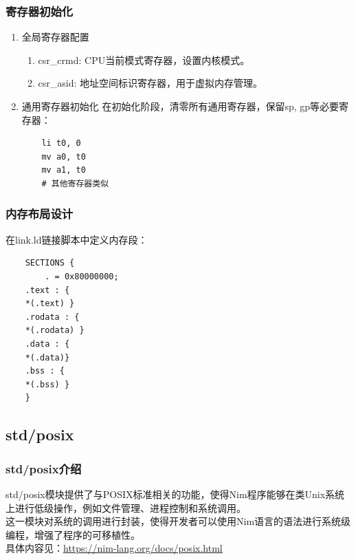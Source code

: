 \documentclass[UTF8]{ctexart}
\begin{document}
		\subsubsection{寄存器初始化} %
		\begin{enumerate}[leftmargin=3.5em]
			\item 全局寄存器配置
			\begin{enumerate}[leftmargin=1em]
				\item csr\_crmd: CPU当前模式寄存器，设置内核模式。
				\item csr\_asid: 地址空间标识寄存器，用于虚拟内存管理。
			\end{enumerate}
			\item 通用寄存器初始化
			在初始化阶段，清零所有通用寄存器，保留sp, gp等必要寄存器：
			\begin{tcolorbox}[colback=gray!20, colframe=gray!20, rounded corners, boxrule=-5pt, height=0.08\textheight, width=0.2\textwidth, left=0pt, right=0pt, top=0pt, bottom=0pt]
				\begin{verbatim}
	li t0, 0
	mv a0, t0
	mv a1, t0
	# 其他寄存器类似
				\end{verbatim}
			\end{tcolorbox}
		\end{enumerate}
		\subsubsection{内存布局设计} %
		\begin{enumerate}[leftmargin=3.5em]
			在link.ld链接脚本中定义内存段：
			\begin{tcolorbox}[colback=gray!20, colframe=gray!20, rounded corners, boxrule=-5pt, height=0.24\textheight, width=0.23\textwidth, left=0em, right=0pt, top=0pt, bottom=0pt]
				\begin{verbatim}
	SECTIONS {
    	. = 0x80000000;
	.text : {
    *(.text) }
	.rodata : {
    *(.rodata) } 
	.data : {
    *(.data)} 
	.bss : {
    *(.bss) }
	}
				\end{verbatim}
			\end{tcolorbox}	
		\end{enumerate}
	\subsection{std/posix} %
		\subsubsection{std/posix介绍} %
		std/posix模块提供了与POSIX标准相关的功能，使得Nim程序能够在类Unix系统上进行低级操作，例如文件管理、进程控制和系统调用。\\ \hspace*{2em}这一模块对系统的调用进行封装，使得开发者可以使用Nim语言的语法进行系统级编程，增强了程序的可移植性。 \\ \hspace*{2em}具体内容见：\underline{\url{https://nim-lang.org/docs/posix.html}}
\end{document}
